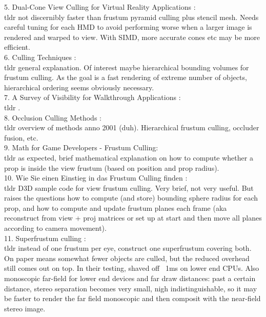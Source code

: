 5. Dual-Cone View Culling for Virtual Reality Applications \cite{Hale.2018}: \\
tldr not discernibly faster than frustum pyramid culling plus stencil mesh. Needs careful tuning for each HMD to avoid performing worse when a larger image is rendered and warped to view. With SIMD, more accurate cones etc may be more efficient.\\

6. Culling Techniques \cite{ITCS.Subramanian}: \\
tldr general explanation. Of interest maybe hierarchical bounding volumes for frustum culling. As the goal is a fast rendering of extreme number of objects, hierarchical ordering seems obviously necessary.\\

7. A Survey of Visibility for Walkthrough Applications \cite{CohenOr.2003}: \\
tldr .\\

8. Occlusion Culling Methods \cite{Hey.2001}: \\
tldr overview of methods anno 2001 (duh). Hierarchical frustum culling, occluder fusion, etc.\\

9. Math for Game Developers - Frustum Culling\cite{Rodriguez.2013}: \\
tldr as expected, brief mathematical explanation on how to compute whether a prop is inside the view frustum (based on position and prop radius).\\

10. Wie Sie einen Einstieg in das Frustum Culling finden \cite{VisCircleGmbH.}: \\
tldr D3D sample code for view frustum culling. Very brief, not very useful. But raises the questions how to compute (and store) bounding sphere radius for each prop, and how to compute and update frustum planes each frame (aka reconstruct from view + proj matrices or set up at start and then move all planes according to camera movement).\\

11. Superfrustum culling \cite{Whiting.2017}: \\
tldr instead of one frustum per eye, construct one superfrustum covering both. On paper means somewhat fewer objects are culled, but the reduced overhead still comes out on top. In their testing, shaved off ~1ms on lower end CPUs. Also monoscopic far-field for lower end devices and far draw distances: past a certain distance, stereo separation becomes very small, nigh indistinguishable, so it may be faster to render the far field monoscopic and then composit with the near-field stereo image.\\

